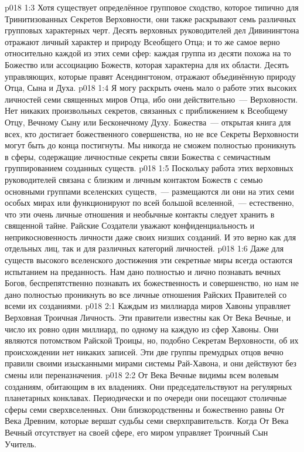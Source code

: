\vs p018 1:3 Хотя существует определённое групповое сходство, которое типично для Тринитизованных Секретов Верховности, они также раскрывают семь различных групповых характерных черт. Десять верховных руководителей дел Дивинингтона отражают личный характер и природу Всеобщего Отца; и то же самое верно относительно каждой из этих семи сфер: каждая группа из десяти похожа на то Божество или ассоциацию Божеств, которая характерна для их области. Десять управляющих, которые правят Асендингтоном, отражают объединённую природу Отца, Сына и Духа.
\vs p018 1:4 \pc Я могу раскрыть очень мало о работе этих высоких личностей семи священных миров Отца, ибо они действительно~---  Верховности. Нет никаких произвольных секретов, связанных с приближением к Всеобщему Отцу, Вечному Сыну или Бесконечному Духу. Божества~--- открытая книга для всех, кто достигает божественного совершенства, но не все Секреты Верховности могут быть до конца постигнуты. Мы никогда не сможем полностью проникнуть в сферы, содержащие личностные секреты связи Божества с семичастным группированием созданных существ.
\vs p018 1:5 Поскольку работа этих верховных руководителей связана с близким и личным контактом Божеств с семью основными группами вселенских существ,~--- размещаются ли они на этих семи особых мирах или функционируют по всей большой вселенной,~--- естественно, что эти очень личные отношения и необычные контакты следует хранить в священной тайне. Райские Создатели уважают конфиденциальность и неприкосновенность личности даже своих низших созданий. И это верно как для отдельных лиц, так и для различных категорий личностей.
\vs p018 1:6 Даже для существ высокого вселенского достижения эти секретные миры всегда остаются испытанием на преданность. Нам дано полностью и лично познавать вечных Богов, беспрепятственно познавать их божественность и совершенство, но нам не дано полностью проникнуть во все личные отношения Райских Правителей со всеми их созданиями.
\vs p018 2:1 Каждым из миллиарда миров Хавоны управляет Верховная Троичная Личность. Эти правители известны как От Века Вечные, и число их ровно один миллиард, по одному на каждую из сфер Хавоны. Они являются потомством Райской Троицы, но, подобно Секретам Верховности, об их происхождении нет никаких записей. Эти две группы премудрых отцов вечно правили своими изысканными мирами системы Рай\hyp{}Хавона, и они действуют без смены или переназначения.
\vs p018 2:2 От Века Вечные видимы всем волевым созданиям, обитающим в их владениях. Они председательствуют на регулярных планетарных конклавах. Периодически и по очереди они посещают столичные сферы семи сверхвселенных. Они близкородственны и божественно равны От Века Древним, которые вершат судьбы семи сверхправительств. Когда От Века Вечный отсутствует на своей сфере, его миром управляет Троичный Сын Учитель.

